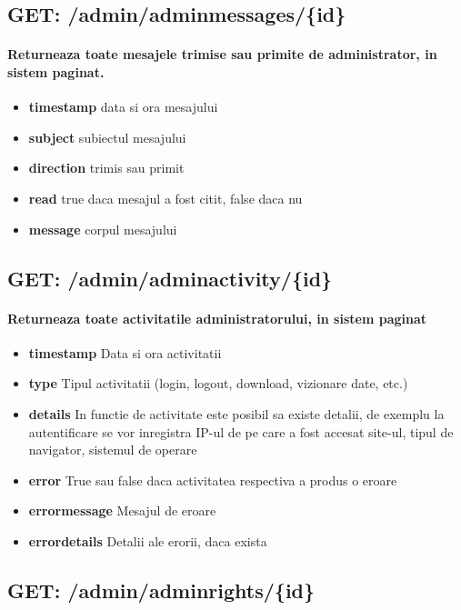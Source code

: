  \subsection*{GET: /admin/adminmessages/\{id\}}

\paragraph{Returneaza toate mesajele trimise sau primite de administrator, in sistem paginat.}
\begin{itemize}
\item \textbf{timestamp}
 data si ora mesajului
\item \textbf{subject}
 subiectul mesajului
\item \textbf{direction}
 trimis sau primit
\item \textbf{read}
 true daca mesajul a fost citit, false daca nu
\item \textbf{message}
 corpul mesajului
 \end{itemize}
 \subsection*{GET: /admin/adminactivity/\{id\}}

\paragraph{Returneaza toate activitatile administratorului, in sistem paginat}
\begin{itemize}
\item \textbf{timestamp}
 Data si ora activitatii
\item \textbf{type}
 Tipul activitatii (login, logout, download, vizionare date, etc.)
\item \textbf{details}
 In functie de activitate este posibil sa existe detalii, de exemplu la autentificare se vor inregistra IP-ul de pe care a fost accesat site-ul, tipul de navigator, sistemul de operare
\item \textbf{error}
 True sau false daca activitatea respectiva a produs o eroare
\item \textbf{errormessage}
 Mesajul de eroare
\item \textbf{errordetails}
 Detalii ale erorii, daca exista
 \end{itemize}
 \subsection*{GET: /admin/adminrights/\{id\}}

